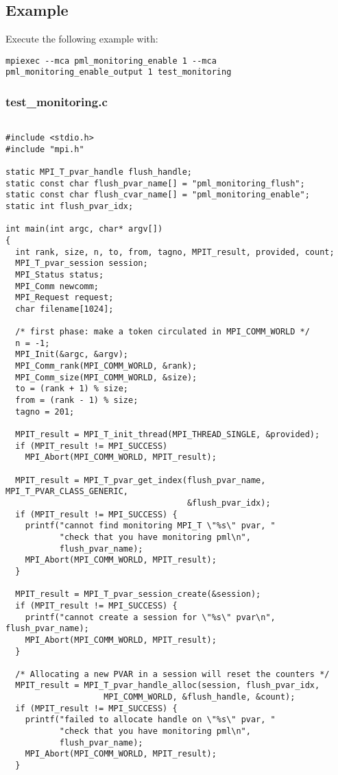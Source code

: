 \documentclass[notitlepage]{article}
\begin{document}
\subsection{Example}

Execute the following example with:
\begin{verbatim}
mpiexec --mca pml_monitoring_enable 1 --mca pml_monitoring_enable_output 1 test_monitoring
\end{verbatim}

\subsubsection{test\_monitoring.c}

\begin{verbatim}
  
#include <stdio.h>
#include "mpi.h"

static MPI_T_pvar_handle flush_handle;
static const char flush_pvar_name[] = "pml_monitoring_flush";
static const char flush_cvar_name[] = "pml_monitoring_enable";
static int flush_pvar_idx;

int main(int argc, char* argv[])
{
  int rank, size, n, to, from, tagno, MPIT_result, provided, count;
  MPI_T_pvar_session session;
  MPI_Status status;
  MPI_Comm newcomm;
  MPI_Request request;
  char filename[1024];

  /* first phase: make a token circulated in MPI_COMM_WORLD */
  n = -1;
  MPI_Init(&argc, &argv);
  MPI_Comm_rank(MPI_COMM_WORLD, &rank);
  MPI_Comm_size(MPI_COMM_WORLD, &size);
  to = (rank + 1) % size;
  from = (rank - 1) % size;
  tagno = 201;

  MPIT_result = MPI_T_init_thread(MPI_THREAD_SINGLE, &provided);
  if (MPIT_result != MPI_SUCCESS)
    MPI_Abort(MPI_COMM_WORLD, MPIT_result);

  MPIT_result = MPI_T_pvar_get_index(flush_pvar_name, MPI_T_PVAR_CLASS_GENERIC, 
                                     &flush_pvar_idx);
  if (MPIT_result != MPI_SUCCESS) {
    printf("cannot find monitoring MPI_T \"%s\" pvar, "
           "check that you have monitoring pml\n",
           flush_pvar_name);
    MPI_Abort(MPI_COMM_WORLD, MPIT_result);
  }

  MPIT_result = MPI_T_pvar_session_create(&session);
  if (MPIT_result != MPI_SUCCESS) {
    printf("cannot create a session for \"%s\" pvar\n", flush_pvar_name);
    MPI_Abort(MPI_COMM_WORLD, MPIT_result);
  }

  /* Allocating a new PVAR in a session will reset the counters */
  MPIT_result = MPI_T_pvar_handle_alloc(session, flush_pvar_idx,
					MPI_COMM_WORLD, &flush_handle, &count);
  if (MPIT_result != MPI_SUCCESS) {
    printf("failed to allocate handle on \"%s\" pvar, "
           "check that you have monitoring pml\n",
           flush_pvar_name);
    MPI_Abort(MPI_COMM_WORLD, MPIT_result);
  }


\end{verbatim}
\end{document}
